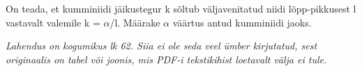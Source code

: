 
On teada, et kumminiidi jäikustegur k sõltub väljavenitatud niidi lõpp-pikkusest l vastavalt valemile k = $\alpha$/l. Määrake $\alpha$ väärtus antud kumminiidi jaoks.

\hint

\solu
\textit{Lahendus on kogumikus lk 62. Siia ei ole seda veel ümber kirjutatud, sest originaalis on tabel või joonis, mis PDF-i tekstikihist loetavalt välja ei tule.}
\probend
